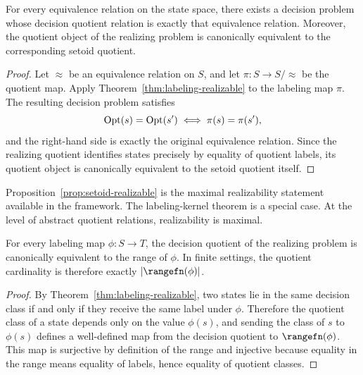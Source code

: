 \begin{proposition}\label{prop:setoid-realizable}
For every equivalence relation on the state space, there exists a decision problem whose decision quotient relation is exactly that equivalence relation. Moreover, the quotient object of the realizing problem is canonically equivalent to the corresponding setoid quotient.
\end{proposition}

\begin{proof}
Let $\approx$ be an equivalence relation on $S$, and let $\pi : S \to S/{\approx}$ be the quotient map. Apply Theorem~\ref{thm:labeling-realizable} to the labeling map $\pi$. The resulting decision problem satisfies
\[
\operatorname{Opt}(s)=\operatorname{Opt}(s') \iff \pi(s)=\pi(s'),
\]
and the right-hand side is exactly the original equivalence relation. Since the realizing quotient identifies states precisely by equality of quotient labels, its quotient object is canonically equivalent to the setoid quotient itself.
\end{proof}

Proposition~\ref{prop:setoid-realizable} is the maximal realizability statement available in the framework. The labeling-kernel theorem is a special case. At the level of abstract quotient relations, realizability is maximal.

\begin{proposition}\label{prop:realized-quotient-range}
For every labeling map $\phi : S \to T$, the decision quotient of the realizing problem is canonically equivalent to the range of $\phi$. In finite settings, the quotient cardinality is therefore exactly $|\rangefn(\phi)|$.
\end{proposition}

\begin{proof}
By Theorem~\ref{thm:labeling-realizable}, two states lie in the same decision class if and only if they receive the same label under $\phi$. Therefore the quotient class of a state depends only on the value $\phi(s)$, and sending the class of $s$ to $\phi(s)$ defines a well-defined map from the decision quotient to $\rangefn(\phi)$. This map is surjective by definition of the range and injective because equality in the range means equality of labels, hence equality of quotient classes.
\end{proof}

